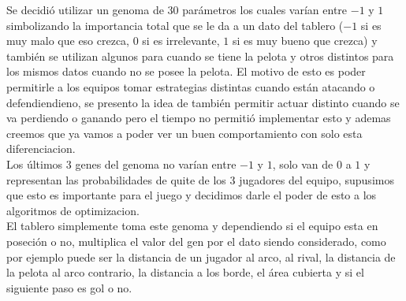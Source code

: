 Se decidió utilizar un genoma de 30 parámetros los cuales varían entre $-1$ y $1$ simbolizando la importancia total
que se le da a un dato del tablero ($-1$ si es muy malo que eso crezca, $0$ si es irrelevante, $1$ si es muy bueno que crezca)
y también se utilizan algunos para cuando se tiene la pelota y otros distintos para los mismos datos
cuando no se posee la pelota. El motivo de esto es poder permitirle a los equipos tomar estrategias distintas cuando están
atacando o defendiendieno, se presento la idea de también permitir actuar distinto cuando se va perdiendo o ganando pero
el tiempo no permitió implementar esto y ademas creemos que ya vamos a poder ver un buen comportamiento con solo esta
diferenciacion.\\

Los últimos 3 genes del genoma no varían entre $-1$ y $1$, solo van de $0$ a $1$ y representan las probabilidades de quite
de los 3 jugadores del equipo, supusimos que esto es importante para el juego y decidimos darle el poder de esto
a los algoritmos de optimizacion.\\


El tablero simplemente toma este genoma y dependiendo si el equipo esta en poseción o no, multiplica el valor del gen por
el dato siendo considerado, como por ejemplo puede ser la distancia de un jugador al arco, al rival, la distancia de la pelota
al arco contrario, la distancia a los borde, el área cubierta y si el siguiente paso es gol o no.
